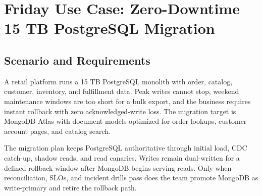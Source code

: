 \section{Friday Use Case: Zero-Downtime 15 TB PostgreSQL Migration}
\subsection{Scenario and Requirements}
A retail platform runs a 15 TB PostgreSQL monolith with order, catalog, customer, inventory, and fulfillment data. Peak writes cannot stop, weekend maintenance windows are too short for a bulk export, and the business requires instant rollback with zero acknowledged-write loss. The migration target is MongoDB Atlas with document models optimized for order lookups, customer account pages, and catalog search.

The migration plan keeps PostgreSQL authoritative through initial load, CDC catch-up, shadow reads, and read canaries. Writes remain dual-written for a defined rollback window after MongoDB begins serving reads. Only when reconciliation, SLOs, and incident drills pass does the team promote MongoDB as write-primary and retire the rollback path.

